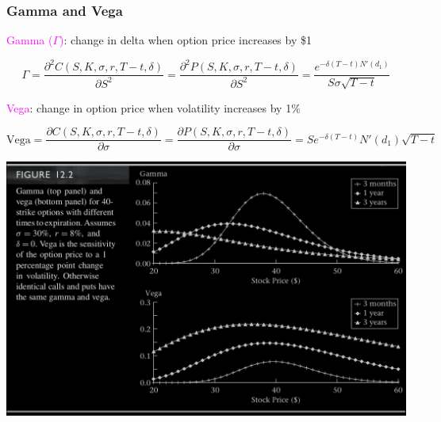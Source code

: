 \begin{frame}[fragile,t]
	\frametitle{Gamma and Vega}
	\centering

	\textcolor{magenta}{Gamma ($\Gamma$)}: change in delta when option price increases by \$1
	\bigskip

	\begin{equation*}
		\Gamma = \frac{\partial^2 C(S,K,\sigma,r,T-t,\delta)}{\partial S^2}
           = \frac{\partial^2 P(S,K,\sigma,r,T-t,\delta)}{\partial S^2}
           = \frac{e^{-\delta(T-t)N'(d_1)}}{S\sigma \sqrt{T-t}}
	\end{equation*}

	\vfill
	\mySeparateLine
	\vfill

	\textcolor{magenta}{Vega}: change in option price when volatility increases by 1\%
	\bigskip

	\begin{equation*}
		\text{Vega} = \frac{\partial C(S,K,\sigma,r,T-t,\delta)}{\partial \sigma}
                = \frac{\partial P(S,K,\sigma,r,T-t,\delta)}{\partial \sigma}
								= S e^{-\delta (T-t)} N'(d_1) \sqrt{T-t}
	\end{equation*}
\end{frame}
\begin{frame}[fragile]
\begin{center}
	\includegraphics[scale=0.2]{figs/Figure-12-2.png}
\end{center}
\end{frame}
